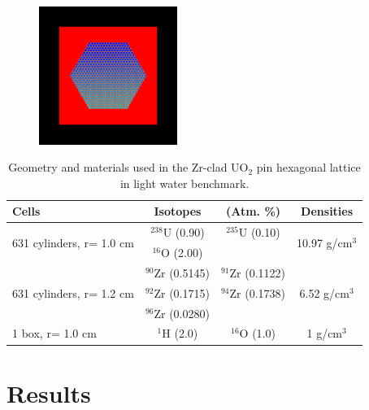 \documentclass[preprint,12pt]{elsarticle}
\begin{document}
\begin{figure}[h!] 
  \centering
    \includegraphics[width=0.4\textwidth]{graphics/assembly-lw-xy.png}
     \caption{  \label{hex_geom_pic} }
\end{figure}

\begin{table}[h]
\centering
\caption{Geometry and materials used in the Zr-clad UO$_2$ pin hexagonal lattice in light water benchmark.}
\label{hex_geom}
\begin{tabular}{| l | c  c | c |}
\hline
Cells & Isotopes & (Atm. \%) & Densities \\
\hline
\multirow{2}{*}{631 cylinders, r= 1.0 cm }  &   $^{238}$U   (0.90)   &    $^{235}$U   (0.10)  &  \multirow{2}{*}{10.97 g/cm$^3$} \\
                                           &   $^{16}$O    (2.00)   &                        &  \\
\hline
\multirow{3}{*}{631 cylinders, r= 1.2 cm }  &   $^{90}$Zr   (0.5145) &    $^{91}$Zr   (0.1122)&  \multirow{3}{*}{6.52 g/cm$^3$} \\
                                           &   $^{92}$Zr   (0.1715) &    $^{94}$Zr   (0.1738)& \\
                                           &   $^{96}$Zr   (0.0280) &                        & \\
\hline
\multirow{1}{*}{1 box, r= 1.0 cm }         &   $^{1}$H     (2.0)    &   $^{16}$O  (1.0) & \multirow{1}{*}{1 g/cm$^3$} \\
\hline
\end{tabular}
\end{table}




\section{Results}
\label{sec:results}
 
\end{document}
